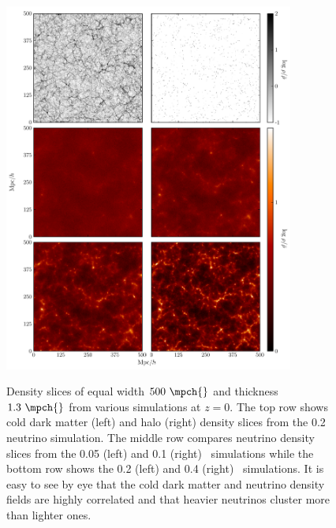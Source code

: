 \begin{figure}
\begin{center}
\includegraphics[width=0.85\textwidth]{./figures/neutrinos/fig1.pdf} \vspace{-0.1cm}
\caption[Cold dark matter, neutrino, and halo density slices]
{Density slices of equal width $500\ \mpch{}$ and
thickness $1.3\ \mpch{}$ from various simulations at
$z = 0$.  The top row shows cold dark matter (left) and halo
(right) density slices from the 0.2\ \ev{} neutrino
simulation. The middle row compares neutrino density slices
from the 0.05 (left) and 0.1 (right)\ \ev{} simulations
while the bottom row shows the 0.2 (left) and 0.4 (right)\
\ev{} simulations.  It is easy to see by eye that the cold dark
matter and neutrino density fields are highly correlated and
that heavier neutrinos cluster more than lighter ones.}
\vspace{-0.5cm}
\label{fig:denslice}
\end{center}
\end{figure}

